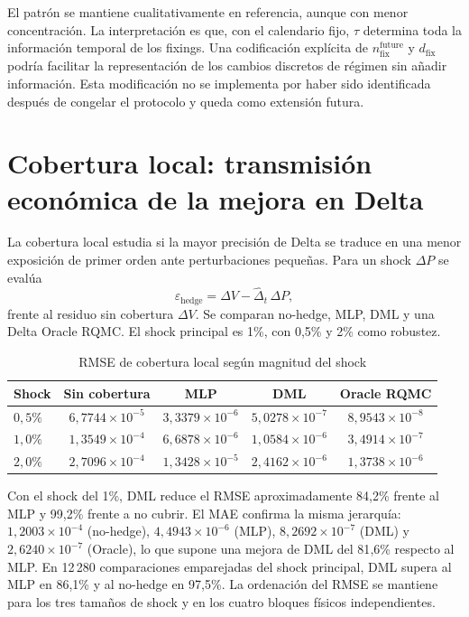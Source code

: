 El patrón se mantiene cualitativamente en referencia, aunque con menor concentración. La
interpretación es que, con el calendario fijo, $\tau$ determina toda la información
temporal de los fixings. Una codificación explícita de $n_{\mathrm{fix}}^{\mathrm{future}}$ y $d_{\mathrm{fix}}$ podría
facilitar la representación de los cambios discretos de régimen sin añadir información. Esta modificación no se
implementa por haber sido identificada después de congelar el protocolo y queda como
extensión futura.

\section{Cobertura local: transmisión económica de la mejora en Delta}
\label{sec:local_hedging}

La cobertura local estudia si la mayor precisión de Delta se traduce en una menor exposición
de primer orden ante perturbaciones pequeñas. Para un shock $\Delta P$ se evalúa
\begin{equation}
    \varepsilon_{\mathrm{hedge}}
    =
    \Delta V-\widehat{\Delta}_t\,\Delta P,
    \label{eq:local_hedge_residual_results}
\end{equation}
frente al residuo sin cobertura $\Delta V$. Se comparan no-hedge, MLP, DML y una Delta
Oracle RQMC. El shock principal es 1\%, con 0{,}5\% y 2\% como robustez.

\begin{table}[htbp]
\centering
\small
\caption{RMSE de cobertura local según magnitud del shock}
\label{tab:local_hedge_rmse}
\begin{tabular}{lcccc}
\toprule
\textbf{Shock}
& \textbf{Sin cobertura}
& \textbf{MLP}
& \textbf{DML}
& \textbf{Oracle RQMC} \\
\midrule
$0{,}5\%$
& $6{,}7744\times10^{-5}$
& $3{,}3379\times10^{-6}$
& $5{,}0278\times10^{-7}$
& $8{,}9543\times10^{-8}$ \\
$1{,}0\%$
& $1{,}3549\times10^{-4}$
& $6{,}6878\times10^{-6}$
& $1{,}0584\times10^{-6}$
& $3{,}4914\times10^{-7}$ \\
$2{,}0\%$
& $2{,}7096\times10^{-4}$
& $1{,}3428\times10^{-5}$
& $2{,}4162\times10^{-6}$
& $1{,}3738\times10^{-6}$ \\
\bottomrule
\end{tabular}
\end{table}

Con el shock del 1\%, DML reduce el RMSE aproximadamente 84{,}2\% frente al
MLP y 99{,}2\% frente a no cubrir. El MAE confirma la misma jerarquía:
$1{,}2003\times10^{-4}$ (no-hedge), $4{,}4943\times10^{-6}$ (MLP),
$8{,}2692\times10^{-7}$ (DML) y $2{,}6240\times10^{-7}$ (Oracle), lo que
supone una mejora de DML del 81{,}6\% respecto al MLP. En 12\,280
comparaciones emparejadas del shock principal, DML supera al MLP en 86{,}1\% y al
no-hedge en 97{,}5\%. La ordenación del RMSE se mantiene para los tres tamaños de shock
y en los cuatro bloques físicos independientes.

